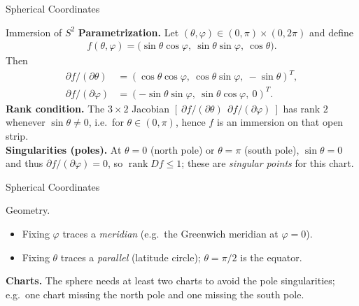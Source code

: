 \begin{frame}{Spherical Coordinates}
\vspace{-0.2cm}
\begin{block}{Immersion of $S^2$}
\textbf{Parametrization.} Let $(\theta,\varphi)\in(0,\pi)\times(0,2\pi)$ and define
\vspace{-0.3cm}
\begin{align*}
f(\theta,\varphi)
=\big(\sin\theta\cos\varphi,\ \sin\theta\sin\varphi,\ \cos\theta\big).
\end{align*}
Then
\vspace{-0.3cm}
\begin{align*}
\partial f / (\partial \theta)&=(\cos\theta\cos\varphi,\ \cos\theta\sin\varphi,\ -\sin\theta)^T,\\
\partial f / (\partial \varphi)&=(-\sin\theta\sin\varphi,\ \sin\theta\cos\varphi,\ 0)^T.
\end{align*}
\textbf{Rank condition.} The $3\times 2$ Jacobian $[\ \partial f / (\partial \theta)\ \ \partial f / (\partial \varphi)\ ]$ has rank $2$ whenever $\sin\theta\neq 0$, i.e.\ for $\theta\in(0,\pi)$, hence $f$ is an immersion on that open strip.\\
\textbf{Singularities (poles).} At $\theta=0$ (north pole) or $\theta=\pi$ (south pole), $\sin\theta=0$ and thus $\partial f / (\partial \varphi)=0$, so $\operatorname{rank} Df \le 1$; these are \emph{singular points} for this chart.
\end{block}
\end{frame}



\begin{frame}{Spherical Coordinates}
\begin{block}{Geometry.}
\begin{itemize}
\item Fixing $\varphi$ traces a \emph{meridian} (e.g.\ the Greenwich meridian at $\varphi=0$).
\item Fixing $\theta$ traces a \emph{parallel} (latitude circle); $\theta=\pi/2$ is the equator.
\end{itemize}

\textbf{Charts.} The sphere needs at least two charts to avoid the pole singularities; e.g.\ one chart missing the north pole and one missing the south pole.
\end{block}
\end{frame}

